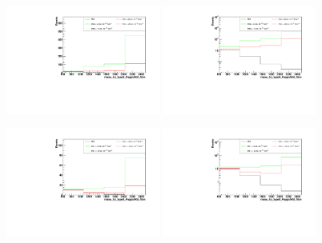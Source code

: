 \begin{figure}[h]
  \begin{center}
	\includegraphics[width=0.45\textwidth]{Plots/aQGC_kinematics/mass_lvj_type0_PuppiAK8_4bin_FS0.pdf}%
	\includegraphics[width=0.45\textwidth]{Plots/aQGC_kinematics/mass_lvj_type0_PuppiAK8_4bin_FS0_log.pdf}\\	
    \caption{}
  \end{center}
\end{figure}
\begin{figure}[h]
  \begin{center}
	\includegraphics[width=0.45\textwidth]{Plots/aQGC_kinematics/mass_lvj_type0_PuppiAK8_4bin_FS1.pdf}%
	\includegraphics[width=0.45\textwidth]{Plots/aQGC_kinematics/mass_lvj_type0_PuppiAK8_4bin_FS1_log.pdf}\\	
    \caption{}
  \end{center}
\end{figure}
